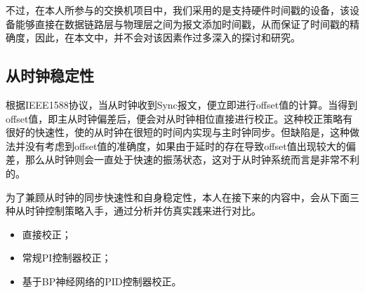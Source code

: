 不过，在本人所参与的交换机项目中，我们采用的是支持硬件时间戳的设备，该设备能够直接在数据链路层与物理层之间为报文添加时间戳，从而保证了时间戳的精确度，因此，在本文中，并不会对该因素作过多深入的探讨和研究。

\subsection{从时钟稳定性}
\label{sec:1588_problem_3}
根据IEEE1588协议，当从时钟收到Sync报文，便立即进行offset值的计算。当得到offset值，即主从时钟偏差后，便会对从时钟相位直接进行校正。这种校正策略有很好的快速性，使的从时钟在很短的时间内实现与主时钟同步。但缺陷是，这种做法并没有考虑到offset值的准确度，如果由于延时的存在导致offset值出现较大的偏差，那么从时钟则会一直处于快速的振荡状态，这对于从时钟系统而言是非常不利的。

为了兼顾从时钟的同步快速性和自身稳定性，本人在接下来的内容中，会从下面三种从时钟控制策略入手，通过分析并仿真实践来进行对比。
\begin{itemize}[noitemsep,topsep=0pt,parsep=0pt,partopsep=0pt]
	\item 直接校正；
	\item 常规PI控制器校正；
	\item 基于BP神经网络的PID控制器校正。
\end{itemize}




